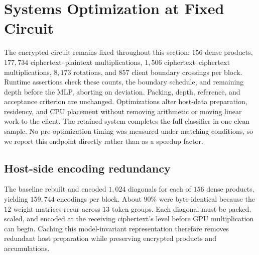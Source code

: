%

\section{Systems Optimization at Fixed Circuit}
\label{sec:optimization}

The encrypted circuit remains fixed throughout this section: $156$ dense products,
$177{,}734$ ciphertext--plaintext multiplications, $1{,}506$ ciphertext--ciphertext multiplications,
$8{,}173$ rotations, and $857$ client boundary crossings per block. Runtime assertions check these
counts, the boundary schedule, and remaining depth before the MLP, aborting on deviation. Packing,
depth, reference, and acceptance criterion are unchanged. Optimizations alter host-data preparation,
residency, and CPU placement without removing arithmetic or moving linear work to the client.
The retained system completes the full classifier in one clean sample. No pre-optimization timing
was measured under matching conditions, so we report this endpoint directly rather than as a
speedup factor.

\subsection{Host-side encoding redundancy}
The baseline rebuilt and encoded $1{,}024$ diagonals for each of $156$ dense products, yielding
$159{,}744$ encodings per block. About $90\%$ were byte-identical because the $12$ weight matrices
recur across $13$ token groups. Each diagonal must be packed, scaled, and encoded at the receiving
ciphertext's level before GPU multiplication can begin. Caching this model-invariant representation
therefore removes redundant host preparation while preserving encrypted products and accumulations.

